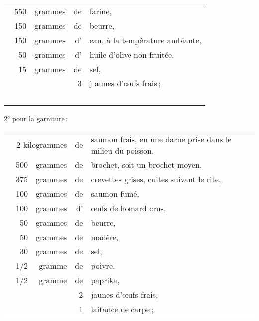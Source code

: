 \medskip

\footnotesize
\begin{longtable}{rrrp{16em}}
    550 & grammes & de & farine,                                                                          \\ 
    150 & grammes & de & beurre,                                                                          \\ 
    150 & grammes & d' & eau, à la température ambiante,                                                  \\ 
     50 & grammes & d' & huile d'olive non fruitée,                                                       \\ 
     15 & grammes & de & sel,                                                                             \\ 
        &         & 3  &j aunes d'œufs frais ;                                                            \\ 
\end{longtable}
\normalsize

\medskip

2° pour la garniture :

\medskip

\footnotesize
\begin{longtable}{rrrrp{16em}}
  & \multicolumn{2}{r}{2 kilogrammes} & de & saumon frais, en une darne prise dans le milieu du poisson,  \\
  & 500 & grammes & de & brochet, soit un brochet moyen,                                                  \\
  & 375 & grammes & de & crevettes grises, cuites suivant le rite,                                        \\
  & 100 & grammes & de & saumon fumé,                                                                     \\
  & 100 & grammes & d' & œufs de homard crus,                                                             \\
  &  50 & grammes & de & beurre,                                                                          \\
  &  50 & grammes & de & madère,                                                                          \\
  &  30 & grammes & de & sel,                                                                             \\
  & 1/2 & gramme  & de & poivre,                                                                          \\
  & 1/2 & gramme  & de & paprika,                                                                         \\
  &     &         &  2 & jaunes d'œufs frais,                                                             \\
  &     &         &  1 & laitance de carpe ;                                                              \\
\end{longtable}
\normalsize

